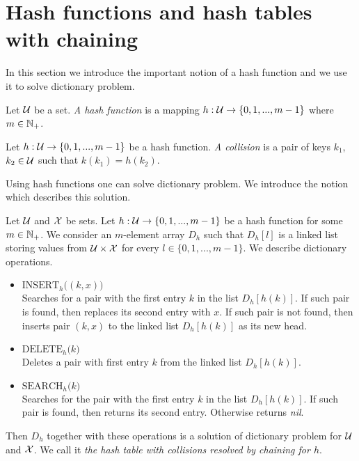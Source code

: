 \section{Hash functions and hash tables with chaining}
\noindent
In this section we introduce the important notion of a hash function and we use it to solve dictionary problem.

\begin{definition}
Let ${\mathcal U}$ be a set. \textit{A hash function} is a mapping $h:{\mathcal U}\rightarrow \{0,1,...,m-1\}$ where $m\in {\mathbb N}_+$.
\end{definition}

\begin{definition}
Let $h:{\mathcal U} \rightarrow \{0,1,...,m-1\}$ be a hash function. \textit{A collision} is a pair of keys $k_1$, $k_2\in {\mathcal U}$ such that $k(k_1) = h(k_2)$.
\end{definition}
\noindent
Using hash functions one can solve dictionary problem. We introduce the notion which describes this solution. 

\begin{definition}
Let ${\mathcal U}$ and ${\mathcal X}$ be sets. Let $h:{\mathcal U}\rightarrow \{0,1,...,m-1\}$ be a hash function for some $m\in {\mathbb N}_+$. We consider an $m$-element array $D_h$ such that $D_h[l]$ is a linked list storing values from ${\mathcal U}\times {\mathcal X}$ for every $l\in \{0,1,...,m-1\}$. We describe dictionary operations.
\begin{itemize}
\item[] $\textrm{INSERT}_h\big((k,x)\big)$\\
Searches for a pair with the first entry $k$ in the list $D_h[h(k)]$. If such pair is found, then replaces its second entry with $x$. If such pair is not found, then inserts pair $(k,x)$ to the linked list $D_h[h(k)]$ as its new head.
\item[] $\textrm{DELETE}_h\big(k\big)$\\
Deletes a pair with first entry $k$ from the linked list $D_h[h(k)]$.
\item[] $\textrm{SEARCH}_h\big(k\big)$\\
Searches for the pair with the first entry $k$ in the list $D_h[h(k)]$. If such pair is found, then returns its second entry. Otherwise returns \textit{nil}. 
\end{itemize}
Then $D_h$ together with these operations is a solution of dictionary problem for ${\mathcal U}$ and ${\mathcal X}$. We call it \textit{the hash table with collisions resolved by chaining for $h$}.
\end{definition}

